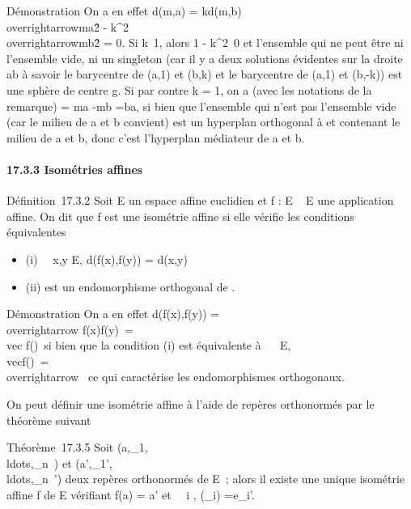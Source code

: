 \documentclass[]{article}
\begin{document}
Démonstration On a en effet d(m,a) = kd(m,b)
\Leftrightarrow
\\overrightarrowma\^2
-
k^2\\overrightarrowmb\^2
= 0. Si k\neq~1, alors 1 -
k^2\neq~0 et l'ensemble qui ne peut
être ni l'ensemble vide, ni un singleton (car il y a deux solutions
évidentes sur la droite ab à savoir le barycentre de (a,1) et (b,k) et
le barycentre de (a,1) et (b,-k)) est une sphère de centre g. Si par
contre k = 1, on a (avec les notations de la remarque)
\overrightarrowu =\overrightarrow
ma -\overrightarrow mb
=\overrightarrow ba, si bien que l'ensemble qui n'est
pas l'ensemble vide (car le milieu de a et b convient) est un hyperplan
orthogonal à \overrightarrowba et contenant le milieu
de a et b, donc c'est l'hyperplan médiateur de a et b.

\paragraph{17.3.3 Isométries affines}

Définition~17.3.2 Soit E un espace affine euclidien et f : E \rightarrow~ E une
application affine. On dit que f est une isométrie affine si elle
vérifie les conditions équivalentes

\begin{itemize}
\itemsep1pt\parskip0pt
\item
  (i) \forall~~x,y \in E, d(f(x),f(y)) = d(x,y)
\item
  (ii) \vecf est un endomorphisme orthogonal de
  \overrightarrowE.
\end{itemize}

Démonstration On a en effet d(f(x),f(y))
=\\overrightarrow
f(x)f(y)\
=\\vec
f(\overrightarrowxy)\ si
bien que la condition (i) est équivalente à
\forall~\overrightarrow\xi~
\in\overrightarrow E,
\\vecf(\overrightarrow\xi)\
=\\overrightarrow
\xi\ ce qui caractérise les endomorphismes
orthogonaux.

On peut définir une isométrie affine à l'aide de repères orthonormés par
le théorème suivant

Théorème~17.3.5 Soit
(a,\vece_1,\\ldots,\vece_n~)
et
(a',\vece_1',\\ldots,\vece_n~')
deux repères orthonormés de E~; alors il existe une unique isométrie
affine f de E vérifiant f(a) = a' et \forall~~i \in
[1,n], \vecf(\vece_i)
=\vec e_i'.
\end{document}
